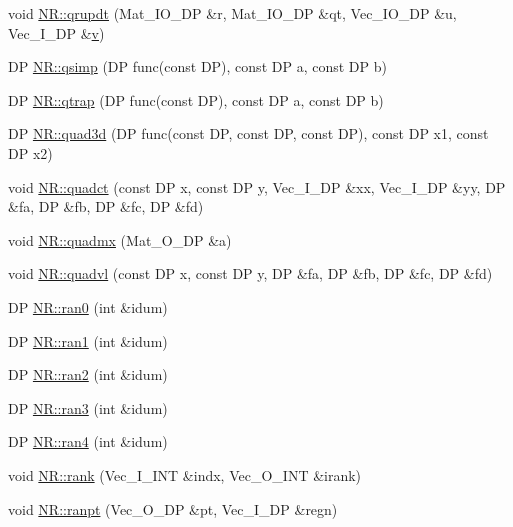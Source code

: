 \begin{DoxyCompactItemize}
\item 
void \mbox{\hyperlink{namespaceNR_aa3906cfa0a92338d1b32d6525fc47eaf}{N\+R\+::qrupdt}} (Mat\+\_\+\+I\+O\+\_\+\+DP \&r, Mat\+\_\+\+I\+O\+\_\+\+DP \&qt, Vec\+\_\+\+I\+O\+\_\+\+DP \&u, Vec\+\_\+\+I\+\_\+\+DP \&\mbox{\hyperlink{adat__devel_2lib_2hadron_2hadron__timeslice_8cc_a716fc87f5e814be3ceee2405ed6ff22a}{v}})
\item 
DP \mbox{\hyperlink{namespaceNR_a30afaca69c5b66b374852a7281bb9b88}{N\+R\+::qsimp}} (DP func(const DP), const DP a, const DP b)
\item 
DP \mbox{\hyperlink{namespaceNR_acc25d32b53d9c38fb962ff11c7ed08be}{N\+R\+::qtrap}} (DP func(const DP), const DP a, const DP b)
\item 
DP \mbox{\hyperlink{namespaceNR_ad9f85b329d999d83a6cf387bcd5fd9a1}{N\+R\+::quad3d}} (DP func(const DP, const DP, const DP), const DP x1, const DP x2)
\item 
void \mbox{\hyperlink{namespaceNR_ae233b6071785340e925720885bb72ebd}{N\+R\+::quadct}} (const DP x, const DP y, Vec\+\_\+\+I\+\_\+\+DP \&xx, Vec\+\_\+\+I\+\_\+\+DP \&yy, DP \&fa, DP \&fb, DP \&fc, DP \&fd)
\item 
void \mbox{\hyperlink{namespaceNR_a4fb019bb24b7e09bb9a1198ca1c679b4}{N\+R\+::quadmx}} (Mat\+\_\+\+O\+\_\+\+DP \&a)
\item 
void \mbox{\hyperlink{namespaceNR_a819df1d348b859d09568c5b871dc40e1}{N\+R\+::quadvl}} (const DP x, const DP y, DP \&fa, DP \&fb, DP \&fc, DP \&fd)
\item 
DP \mbox{\hyperlink{namespaceNR_a51fab0252d34144103c74d4f947e86c1}{N\+R\+::ran0}} (int \&idum)
\item 
DP \mbox{\hyperlink{namespaceNR_a6f5690957c136740f9dd29d51a3dc3fa}{N\+R\+::ran1}} (int \&idum)
\item 
DP \mbox{\hyperlink{namespaceNR_af14605dd4827bb94f49095d407b4fda7}{N\+R\+::ran2}} (int \&idum)
\item 
DP \mbox{\hyperlink{namespaceNR_a0e43557267c69b10738a862f546a0b2b}{N\+R\+::ran3}} (int \&idum)
\item 
DP \mbox{\hyperlink{namespaceNR_aa022fd357d369cb205d0dd59f0e2018a}{N\+R\+::ran4}} (int \&idum)
\item 
void \mbox{\hyperlink{namespaceNR_af609478dc8d3d58e4d09f1f8f8553238}{N\+R\+::rank}} (Vec\+\_\+\+I\+\_\+\+I\+NT \&indx, Vec\+\_\+\+O\+\_\+\+I\+NT \&irank)
\item 
void \mbox{\hyperlink{namespaceNR_a103ce563920343003034206a38ebdbb7}{N\+R\+::ranpt}} (Vec\+\_\+\+O\+\_\+\+DP \&pt, Vec\+\_\+\+I\+\_\+\+DP \&regn)

\end{DoxyCompactItemize}
